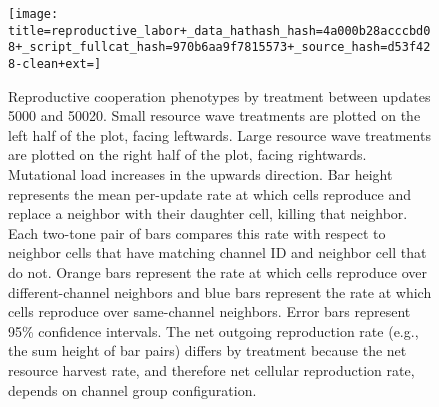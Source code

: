 \begin{figure}[!t]
\begin{center}

\texttt{[image: title=reproductive\_labor+\_data\_hathash\_hash=4a000b28acccbd08+\_script\_fullcat\_hash=970b6aa9f7815573+\_source\_hash=d53f428-clean+ext=]}

\caption{
Reproductive cooperation phenotypes by treatment between updates 5000 and 50020.
Small resource wave treatments are plotted on the left half of the plot, facing leftwards.
Large resource wave treatments are plotted on the right half of the plot, facing rightwards.
Mutational load increases in the upwards direction.
Bar height represents the mean per-update rate at which cells reproduce and replace a neighbor with their daughter cell, killing that neighbor.
Each two-tone pair of bars compares this rate with respect to neighbor cells that have matching channel ID and neighbor cell that do not.
Orange bars represent the rate at which cells reproduce over different-channel neighbors and blue bars represent the rate at which cells reproduce over same-channel neighbors.
Error bars represent 95\% confidence intervals.
The net outgoing reproduction rate (e.g., the sum height of bar pairs) differs by treatment because the net resource harvest rate, and therefore net cellular reproduction rate, depends on channel group configuration.
} \label{fig:reproductive_labor}
\end{center}
\end{figure}
